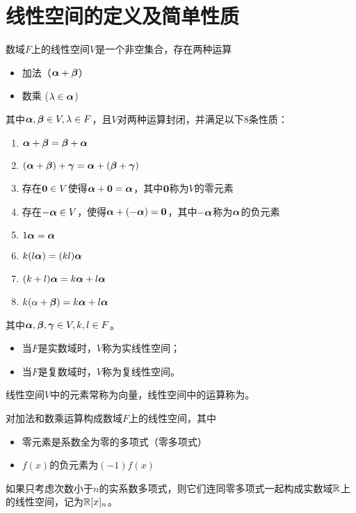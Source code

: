 
\section{线性空间的定义及简单性质}


\begin{frame}
\begin{dingyi}
数域$F$上的线性空间$V$是一个非空集合，存在两种运算
\begin{itemize}
\item 加法（$\boldsymbol{\alpha}+\boldsymbol{\beta}$）
\item 数乘 ($\lambda \in \boldsymbol{\alpha}$)
\end{itemize}
其中$\boldsymbol{\alpha},\boldsymbol{\beta} \in V, \lambda\in F$，且$V$对两种运算封闭，并满足以下$8$条性质：
\begin{enumerate}
\item $\boldsymbol{\alpha}+\boldsymbol{\beta}=\boldsymbol{\beta}+\boldsymbol{\alpha}$
\item $(\boldsymbol{\alpha}+\boldsymbol{\beta})+\boldsymbol{\gamma}=\boldsymbol{\alpha}+(\boldsymbol{\beta}+\boldsymbol{\gamma})$
\item 存在$\M0\in V$使得$\alphabd+\M0=\alphabd$，其中$\M0$称为$V$的零元素
\item 存在$-\boldsymbol{\alpha}\in V$，使得$\alphabd+(-\alphabd)=\M0$，其中$-\boldsymbol{\alpha}$称为$\boldsymbol{\alpha}$的负元素
\item $1\boldsymbol{\alpha} = \boldsymbol{\alpha}$
\item $k(l\boldsymbol{\alpha}) = (kl)\boldsymbol{\alpha}$
\item $(k+l)\boldsymbol{\alpha} = k\boldsymbol{\alpha} + l\boldsymbol{\alpha}$
\item $k(\alpha+\boldsymbol{\beta}) = k \boldsymbol{\alpha} + l \boldsymbol{\alpha}$
\end{enumerate}
其中$\boldsymbol{\alpha},\boldsymbol{\beta},\boldsymbol{\gamma}\in V, k, l \in F$。

\end{dingyi}
\end{frame}

\begin{frame}
  \begin{itemize}
    \item 当$F$是实数域时，$V$称为实线性空间；\\[0.2in]
    \item 当$F$是复数域时，$V$称为复线性空间。
  \end{itemize} \pause

  线性空间$V$中的元素常称为向量，线性空间中的运算称为。
\end{frame}

\begin{frame}
  \begin{li}[数域$F$上的全体多项式$F(x)$]

    对加法和数乘运算构成数域$F$上的线性空间，其中
    \begin{itemize}
      \item 零元素是系数全为零的多项式（零多项式）\\[0.15in]
      \item $f(x)$的负元素为$(-1)f(x)$
    \end{itemize} \pause

    如果只考虑次数小于$n$的实系数多项式，则它们连同零多项式一起构成实数域$\mathbb{R}$上的线性空间，记为$\mathbb{R}[x]_n$。
  \end{li}
\end{frame}

